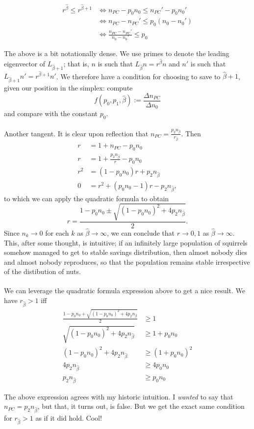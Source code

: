 \begin{align*}
    r^{\hat \beta} \le r^{\hat \beta + 1} &\iff  n_{PC} - p_0n_0 \le n_{PC}' - p_0n_0' \\
    &\iff n_{PC} - n_{PC}' \le p_0\left( n_0 - n_0' \right) \\
    &\iff \frac{n_{PC} - n_{PC}'}{n_0 - n_0'} \le p_0
\end{align*}

The above is a bit notationally dense. We use primes to denote the leading eigenvector of $L_{\hat \beta + 1}$; that is,
$n$ is such that $L_{\hat \beta} n = r^{\hat \beta}n$ and $n'$ is such that $L_{\hat \beta + 1}n' = r^{\hat \beta + 1}n'$. 
We therefore have a condition for choosing to save to $\hat \beta + 1$, given our position in the simplex: compute 
$$ f\left( p_0, p_1, \hat \beta \right) := \frac{ \Delta n_{PC}}{\Delta n_{0}} $$
and compare with the constant $p_0$.  \\ \\

Another tangent. It is clear upon reflection that $n_{PC} = \frac{p_2 n_{\hat \beta}}{r_{\hat \beta}}$. Then 
\begin{align*}
    r &= 1 + n_{PC} - p_0n_0 \\
    r &= 1 + \frac{p_2 n_{\hat \beta}}{r} - p_0 n_0 \\
    r^2 &= (1 - p_0n_0)r + p_2n_{\hat \beta} \\
    0 &= r^2 + \left( p_0n_0 -1 \right)r - p_2n_{\hat \beta},
\end{align*}
to which we can apply the quadratic formula to obtain
$$ r = \frac{ 1 - p_0n_0 \pm \sqrt{\left( 1 - p_0n_0 \right)^2 + 4p_2n_{\hat \beta}}}{2}. $$
Since $n_k\to0$ for each $k$ as $\hat \beta\to \infty$, we can conclude that 
$r\to0, 1$ as $\hat \beta\to \infty$. This, after some thought, is intuitive; if an infinitely large population of squirrels
somehow managed to get to stable savings distribution, then almost nobody dies and almost nobody reproduces, so that the population remains
stable irrespective of the distibution of nuts.  \\\\

We can leverage the quadratic formula expression above to get a nice result. We have $r_{\hat \beta} > 1$ iff
\begin{align*}
    \frac{ 1 - p_0n_0 + \sqrt{(1 - p_0n_0)^2 + 4p_2n_{\hat \beta}}}{2} &\ge 1 \\
    \sqrt{(1 - p_0n_0)^2 + 4p_2n_{\hat \beta}} &\ge 1 + p_0n_0 \\
    (1 - p_0n_0)^2 + 4p_2n_{\hat \beta}  &\ge \left( 1 + p_0n_0 \right)^2 \\
    4p_2n_{\hat\beta} &\ge 4p_0n_0 \\
    p_2n_{\hat\beta} &\ge p_0n_0
\end{align*}

The above expression agrees with my historic intuition. I \textit{wanted} to say that $n_{PC} = p_2n_{\hat \beta}$, but that,
it turns out, is false. But we get the exact same condition for $r_{\hat \beta} > 1$ as if it did hold. Cool!

